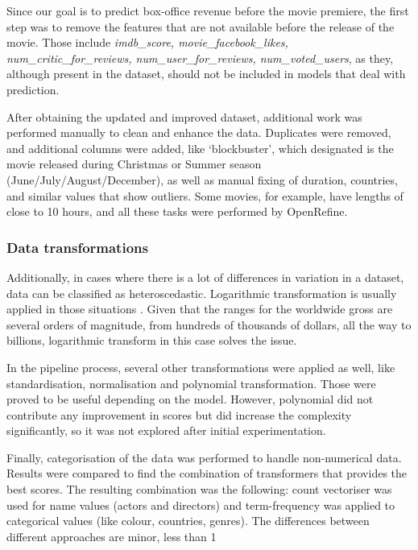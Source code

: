 Since our goal is to predict box-office revenue before the movie premiere, the first step was to remove the features that are not available before the release of the movie. Those include \textit{imdb\_score, movie\_facebook\_likes, num\_critic\_for\_reviews, num\_user\_for\_reviews, num\_voted\_users}, as they, although present in the dataset, should not be included in models that deal with prediction.

After obtaining the updated and improved dataset, additional work was performed manually to clean and enhance the data. Duplicates were removed, and additional columns were added, like ‘blockbuster’, which designated is the movie released during Christmas or Summer season (June/July/August/December), as well as manual fixing of duration, countries, and similar values that show outliers. Some movies, for example, have lengths of close to 10 hours, and all these tasks were performed by OpenRefine.

\subsubsection{Data transformations}
Additionally, in cases where there is a lot of differences in variation in a dataset, data can be classified as heteroscedastic. Logarithmic transformation is usually applied in those situations \cite{kvalheim1994preprocessing}. Given that the ranges for the worldwide gross are several orders of magnitude, from hundreds of thousands of dollars, all the way to billions, logarithmic transform in this case solves the issue.

In the pipeline process, several other transformations were applied as well, like standardisation, normalisation and polynomial transformation. Those were proved to be useful depending on the model. However, polynomial did not contribute any improvement in scores but did increase the complexity significantly, so it was not explored after initial experimentation.

Finally, categorisation of the data was performed to handle non-numerical data. Results were compared to find the combination of transformers that provides the best scores. The resulting combination was the following: count vectoriser was used for name values (actors and directors) and term-frequency was applied to categorical values (like colour, countries, genres). The differences between different approaches are minor, less than 1%


